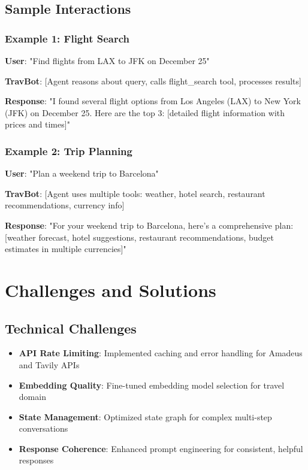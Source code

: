 \documentclass[12pt,a4paper]{article}
\begin{document}
\subsection{Sample Interactions}

\subsubsection{Example 1: Flight Search}
\textbf{User}: "Find flights from LAX to JFK on December 25"

\textbf{TravBot}: [Agent reasons about query, calls flight\_search tool, processes results]

\textbf{Response}: "I found several flight options from Los Angeles (LAX) to New York (JFK) on December 25. Here are the top 3: [detailed flight information with prices and times]"

\subsubsection{Example 2: Trip Planning}
\textbf{User}: "Plan a weekend trip to Barcelona"

\textbf{TravBot}: [Agent uses multiple tools: weather, hotel search, restaurant recommendations, currency info]

\textbf{Response}: "For your weekend trip to Barcelona, here's a comprehensive plan: [weather forecast, hotel suggestions, restaurant recommendations, budget estimates in multiple currencies]"

\section{Challenges and Solutions}

\subsection{Technical Challenges}
\begin{itemize}
\item \textbf{API Rate Limiting}: Implemented caching and error handling for Amadeus and Tavily APIs
\item \textbf{Embedding Quality}: Fine-tuned embedding model selection for travel domain
\item \textbf{State Management}: Optimized state graph for complex multi-step conversations
\item \textbf{Response Coherence}: Enhanced prompt engineering for consistent, helpful responses
\end{itemize}
\end{document}
